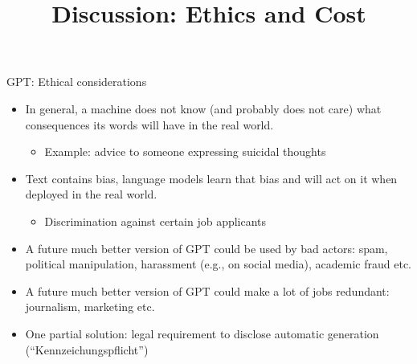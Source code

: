 



\newcommand{\learninggoals}{
\item Understand biases inherent to GPT
\item Get a feeling for the cost and environmental impact}
\def\myblue#1{\textcolor{texblue}{#1}}

\title{Discussion: Ethics and Cost}
\date{}




\begin{vbframe}{GPT: Ethical considerations}

\vfill

  \begin{itemize}
\item In general, a machine does not know (and
probably does not care) what consequences its words will have
in the real world.
  \begin{itemize}
\item Example: advice to someone expressing suicidal thoughts
    \end{itemize}
\item Text contains bias, language models learn that
bias and will act on it when deployed in the real world.
  \begin{itemize}
\item Discrimination against certain job applicants
    \end{itemize}
\item A future much better version of GPT could be
used by bad actors: spam, political manipulation, harassment
(e.g., on social media), academic fraud etc.
\item A future much better version of GPT could make a
lot of jobs redundant: journalism, marketing etc.
\item One partial solution: legal requirement to
disclose automatic generation (``Kennzeichungspflicht'')
    \end{itemize}

\vfill

\end{vbframe}

